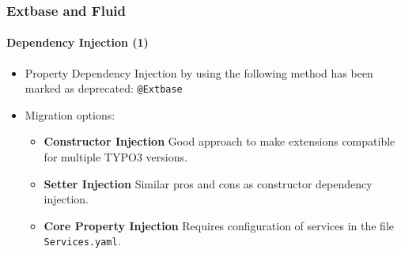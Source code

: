 %

\begin{frame}[fragile]
	\frametitle{Extbase and Fluid}
	\framesubtitle{Dependency Injection (1)}


	\begin{itemize}
		\item Property Dependency Injection by using the following method has
			been marked as deprecated:\newline
			\small\texttt{@Extbase\\\Inject}\normalsize

		\item Migration options:

			\begin{itemize}\small
				\item \textbf{Constructor Injection}\newline
					\smaller
					 	Good approach to make extensions compatible for multiple TYPO3 versions.
					\small
				\item \textbf{Setter Injection}\newline
					\smaller
						Similar pros and cons as constructor dependency injection.
					\small
				\item \textbf{Core Property Injection}\newline
					\smaller
						Requires configuration of services in the file \texttt{Services.yaml}.
					\small
			\end{itemize}\normalsize

	\end{itemize}

\end{frame}

